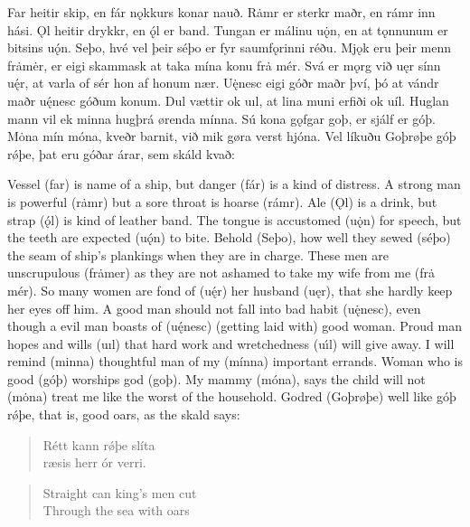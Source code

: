 \begin{paracol}{2}
    Far heitir skip, en fár nǫkkurs konar nauð. Rȧmr er sterkr maðr, en rámr inn hási. Ǫl heitir drykkr, en ǫ́l er band. Tungan er málinu uǫ̇n, en at tǫnnunum er bitsins uǫ́n. Seþo, hvé vel þeir séþo er fyr saumfǫrinni réðu. Mjǫk eru þeir menn frȧmėr, er eigi skammask at taka mína konu frȧ mér. Svá er mǫrg við uęr sínn uę́r, at varla of sér hon af honum nær. Uę̇nesc eigi góðr maðr því, þó at vándr maðr uę́nesc góðum konum. Dul vættir ok uıl, at lina muni erfiði ok uíl. Huglan mann vil ek minna hugþrá ørenda mínna. Sú kona gǫfgar goþ, er sjálf er góþ. Mȯna mín móna, kveðr barnit, við mik gøra verst hjóna. Vel líkuðu Goþrøþe góþ rǿþe, þat eru góðar árar, sem skáld kvað:

    \switchcolumn

    Vessel (far) is name of a ship, but danger (fár) is a kind of distress. A strong man is powerful (rȧmr) but a sore throat is hoarse (rámr). Ale (Ǫl) is a drink, but strap (ǫ́l) is kind of leather band. The tongue is accustomed (u\.{ǫ}n) for speech, but the teeth are expected (u\'{ǫ}n) to bite. Behold (Seþo), how well they sewed (séþo) the seam of ship's plankings when they are in charge. These men are unscrupulous (frȧmer) as they are not ashamed to take my wife from me (frȧ mér). So many women are fond of (uę́r) her husband (uęr), that she hardly keep her eyes off him. A good man should not fall into bad habit (uę̇nesc), even though a evil man boasts of (uę́nesc) (getting laid with) good woman. Proud man hopes and wills (uıl) that hard work and wretchedness (u\'{ı}l) will give away. I will remind (minna) thoughtful man of my (mínna) important errands. Woman who is good (góþ) worships god (goþ). My mammy (móna), says the child will not (mȯna) treat me like the worst of the household. Godred (Goþrøþe) well like góþ rǿþe, that is, good oars, as the skald says:

    \switchcolumn*

    \begin{quote}
        Rétt kann rǿþe slíta\\
        ræsis herr ór verri.\\
    \end{quote}

    \switchcolumn

    \begin{quote}
        Straight can king's men cut\\
        Through the sea with oars \\
    \end{quote}


\end{paracol}
